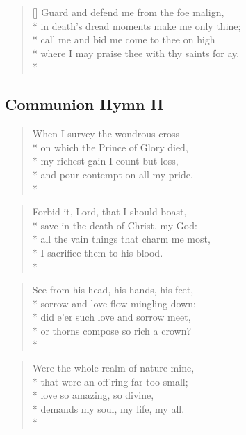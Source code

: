 \documentclass[12pt]{article}
\newcounter{count}
\newcommand\printcount{\addtocounter{count}{1}\thecount}
\begin{document}
\settowidth{\versewidth}{Guard and defend me from the foe malign,}
\begin{verse}[\versewidth]
\flagverse{\printcount.} Guard and defend me from the foe malign,\\*
in death's dread moments make me only thine;\\*
call me and bid me come to thee on high\\*
where I may praise thee with thy saints for ay.\\*
\end{verse}

\begin{center}
\subsection*{Communion Hymn II}
\end{center}
\begin{multicols}{2}
\setcounter{count}{0}
\setcounter{count}{0}
\begin{verse}
\flagverse{\printcount.} When I survey the wondrous cross\\*
on which the Prince of Glory died,\\*
my richest gain I count but loss,\\*
and pour contempt on all my pride.\\*
\end{verse}

\begin{verse}
\flagverse{\printcount.} Forbid it, Lord, that I should boast,\\*
save in the death of Christ, my God:\\*
all the vain things that charm me most,\\*
I sacrifice them to his blood.\\*
\end{verse}

\begin{verse}
\flagverse{\printcount.} See from his head, his hands, his feet,\\*
sorrow and love flow mingling down:\\*
did e'er such love and sorrow meet,\\*
or thorns compose so rich a crown?\\*
\end{verse}

\begin{verse}
\flagverse{\printcount.} Were the whole realm of nature mine,\\*
that were an off'ring far too small;\\*
love so amazing, so divine,\\*
demands my soul, my life, my all.\\*
\end{verse}
\end{multicols}
\end{document}
